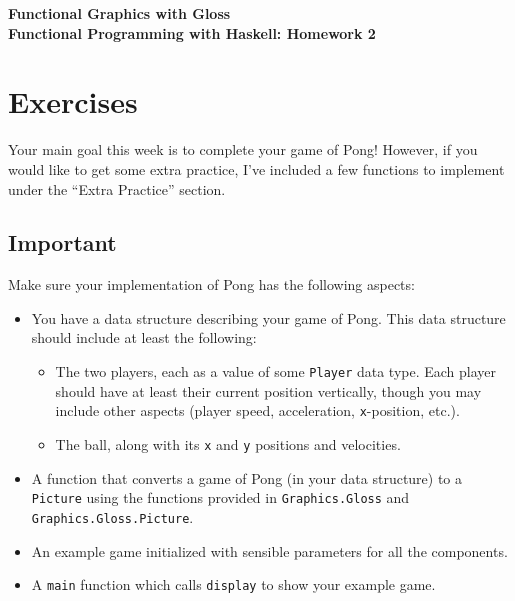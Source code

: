 \documentclass{article}
\begin{document}
\begin{center}
    \bf 
    {\Large Functional Graphics with Gloss} \\[1em]
    {\large Functional Programming with Haskell: Homework 2}
\end{center}

\section*{Exercises}

Your main goal this week is to complete your game of Pong! However, if you would like to get some
extra practice, I've included a few functions to implement under the ``Extra Practice'' section.
\subsection*{Important}
Make sure your implementation of Pong has the following aspects:
\begin{itemize}
    \item You have a data structure describing your game of Pong. This data structure should include
        at least the following:
        \begin{itemize}
            \item The two players, each as a value of some \texttt{Player} data type. Each player
                should have at least their current position vertically, though you may include other
                aspects (player speed, acceleration, \texttt{x}-position, etc.).
            \item The ball, along with its \texttt{x} and \texttt{y} positions and velocities.
        \end{itemize}
    \item A function that converts a game of Pong (in your data structure) to a \texttt{Picture}
        using the functions provided in \texttt{Graphics.Gloss} and \texttt{Graphics.Gloss.Picture}.
    \item An example game initialized with sensible parameters for all the components.
    \item A \texttt{main} function which calls \texttt{display} to show your example game.
\end{itemize}
\end{document}
